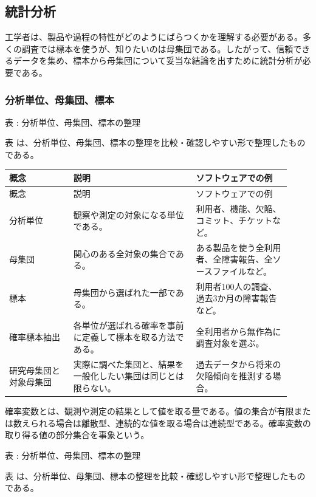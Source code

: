 \subsection{統計分析}
工学者は、製品や過程の特性がどのようにばらつくかを理解する必要がある。多くの調査では標本を使うが、知りたいのは母集団である。したがって、信頼できるデータを集め、標本から母集団について妥当な結論を出すために統計分析が必要である。
\subsubsection{分析単位、母集団、標本}
\par\smallskip\noindent{}\label{tab:ch18-05}表 \thetable: 分析単位、母集団、標本の整理\par\smallskip
表 \thetable は、分析単位、母集団、標本の整理を比較・確認しやすい形で整理したものである。\par\smallskip
\begin{longtable}{>{\raggedright\arraybackslash}p{0.21\linewidth}>{\raggedright\arraybackslash}p{0.40\linewidth}>{\raggedright\arraybackslash}p{0.31\linewidth}}
\toprule
概念 & 説明 & ソフトウェアでの例 \\
\midrule
\endfirsthead
\toprule
概念 & 説明 & ソフトウェアでの例 \\
\midrule
\endhead
分析単位 & 観察や測定の対象になる単位である。 & 利用者、機能、欠陥、コミット、チケットなど。 \\
母集団 & 関心のある全対象の集合である。 & ある製品を使う全利用者、全障害報告、全ソースファイルなど。 \\
標本 & 母集団から選ばれた一部である。 & 利用者100人の調査、過去3か月の障害報告など。 \\
確率標本抽出 & 各単位が選ばれる確率を事前に定義して標本を取る方法である。 & 全利用者から無作為に調査対象を選ぶ。 \\
研究母集団と対象母集団 & 実際に調べた集団と、結果を一般化したい集団は同じとは限らない。 & 過去データから将来の欠陥傾向を推測する場合。 \\
\bottomrule
\end{longtable}
確率変数とは、観測や測定の結果として値を取る量である。値の集合が有限または数えられる場合は離散型、連続的な値を取る場合は連続型である。確率変数の取り得る値の部分集合を事象という。
\par\smallskip\noindent{}\label{tab:ch18-06}表 \thetable: 分析単位、母集団、標本の整理\par\smallskip
表 \thetable は、分析単位、母集団、標本の整理を比較・確認しやすい形で整理したものである。\par\smallskip
